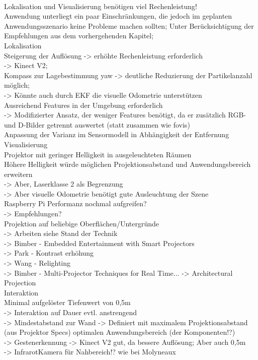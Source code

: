 \\
Lokalisation und Visualisierung benötigen viel Rechenleistung!\\
Anwendung unterliegt ein paar Einschränkungen, die jedoch im geplanten Anwendungsszenario keine Probleme machen sollten; Unter Berücksichtigung der Empfehlungen aus dem vorhergehenden Kapitel;\\

Lokalisation\\
Steigerung der Auflösung -> erhöhte Rechenleistung erforderlich\\
-> Kinect V2;\\
Kompass zur Lagebestimmung yaw -> deutliche Reduzierung der Partikelanzahl möglich;\\
-> Könnte auch durch EKF die visuelle Odometrie unterstützen\\
Ausreichend Features in der Umgebung erforderlich\\
-> Modifizierter Ansatz, der weniger Features benötigt, da er zusätzlich RGB- und D-Bilder getrennt auswertet (statt zusammen wie fovis)\\
Anpassung der Varianz im Sensormodell in Abhängigkeit der Entfernung\\

Visualisierung\\
Projektor mit geringer Helligkeit in ausgeleuchteten Räumen\\
Höhere Helligkeit würde möglichen Projektionsabstand und Anwendungsbereich erweitern\\
-> Aber, Laserklasse 2 als Begrenzung\\
-> Aber visuelle Odometrie benötigt gute Ausleuchtung der Szene\\
Raspberry Pi Performanz nochmal aufgreifen?\\
-> Empfehlungen?\\
Projektion auf beliebige Oberflächen/Untergründe\\
-> Arbeiten siehe Stand der Technik\\
-> Bimber - Embedded Entertainment with Smart Projectors\\
-> Park - Kontrast erhöhung\\
-> Wang - Relighting\\

-> Bimber - Multi-Projector Techniques for Real Time... -> Architectural Projection\\

Interaktion\\
Minimal aufgelöster Tiefenwert von 0,5m\\
-> Interaktion auf Dauer evtl. anstrengend\\
-> Mindestabstand zur Wand -> Definiert mit maximalem Projektionsabstand (aus Projektor Specs) optimalen Anwendungsbereich (der Komponenten!?)\\
-> Gestenerkennung -> Kinect V2 gut, da bessere Auflösung; Aber auch 0,5m\\
-> InfrarotKamera für Nahbereich!? wie bei Molyneaux\\

